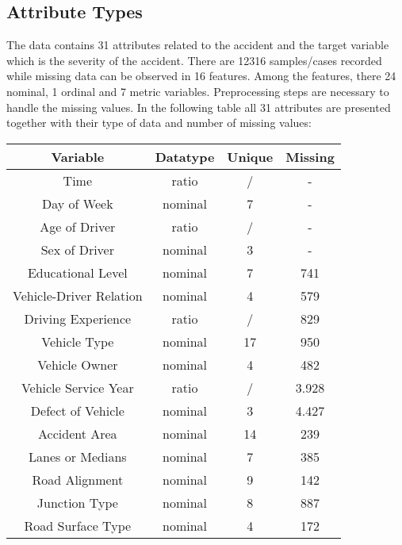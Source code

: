 \documentclass{article}
\begin{document}
\subsection{Attribute Types}

The data contains 31 attributes related to the accident and the target variable which is the severity of the accident. There are 12316 samples/cases recorded while missing data can be observed in 16 features. Among the features, there 24 nominal, 1 ordinal and 7 metric variables. Preprocessing steps are necessary to handle the missing values. In the following table all 31 attributes are presented together with their type of data and number of missing values:

\begin{table}[H]
    \small
    \parbox{.45\linewidth}{
        \begin{tabular}{c|c|c|c}
            \textbf{Variable} & \textbf{Datatype} &
            \textbf{Unique} &  \textbf{Missing}\\\hline
            Time & ratio & / & - \\
            Day of Week & nominal & 7 & -\\
            Age of Driver & ratio & / & -\\
            Sex of Driver & nominal & 3& -\\
            Educational Level & nominal &7 &741\\
            Vehicle-Driver Relation & nominal & 4 & 579 \\
            Driving Experience & ratio  & / & 829\\
            Vehicle Type & nominal & 17 & 950\\
            Vehicle Owner & nominal & 4 & 482\\
            Vehicle Service Year & ratio & / & 3.928\\
            Defect of Vehicle & nominal & 3 & 4.427\\
            Accident Area & nominal & 14 & 239\\
            Lanes or Medians & nominal & 7 & 385\\
            Road Alignment & nominal & 9& 142\\
            Junction Type & nominal & 8 & 887\\
            Road Surface Type & nominal  & 4 &172
        \end{tabular}
}
    \hfill
    \parbox{.45\linewidth}{
        \begin{tabular}{c|c|c|c}

\end{tabular}}
\end{table}
\end{document}
